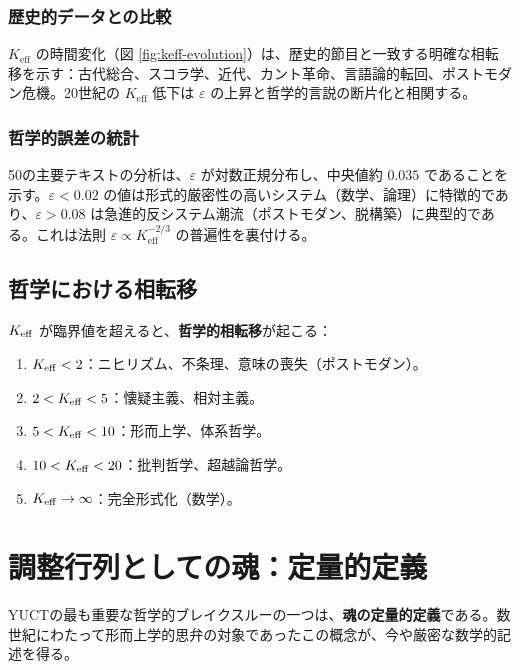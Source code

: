 \documentclass[11pt,a4paper]{article}
\newcommand{\eps}{\varepsilon}
\begin{document}
	\subsubsection{歴史的データとの比較}
	
	\(K_{\mathrm{eff}}\) の時間変化（図 \ref{fig:keff-evolution}）は、歴史的節目と一致する明確な相転移を示す：古代総合、スコラ学、近代、カント革命、言語論的転回、ポストモダン危機。20世紀の \(K_{\mathrm{eff}}\) 低下は \(\eps\) の上昇と哲学的言説の断片化と相関する。
	
	\subsubsection{哲学的誤差の統計}
	
	50の主要テキストの分析は、\(\eps\) が対数正規分布し、中央値約 \(0.035\) であることを示す。\(\eps < 0.02\) の値は形式的厳密性の高いシステム（数学、論理）に特徴的であり、\(\eps > 0.08\) は急進的反システム潮流（ポストモダン、脱構築）に典型的である。これは法則 \(\eps \propto K_{\mathrm{eff}}^{-2/3}\) の普遍性を裏付ける。
	
	\subsection{哲学における相転移}
	
	\(\Keff\) が臨界値を超えると、\textbf{哲学的相転移}が起こる：
	
	\begin{enumerate}
		\item \(\Keff < 2\)：ニヒリズム、不条理、意味の喪失（ポストモダン）。
		\item \(2 < \Keff < 5\)：懐疑主義、相対主義。
		\item \(5 < \Keff < 10\)：形而上学、体系哲学。
		\item \(10 < \Keff < 20\)：批判哲学、超越論哲学。
		\item \(\Keff \to \infty\)：完全形式化（数学）。
	\end{enumerate}
	
	\section{調整行列としての魂：定量的定義}
	\label{sec:soul}
	
	YUCTの最も重要な哲学的ブレイクスルーの一つは、\textbf{魂の定量的定義}である。数世紀にわたって形而上学的思弁の対象であったこの概念が、今や厳密な数学的記述を得る。
	
\end{document}
